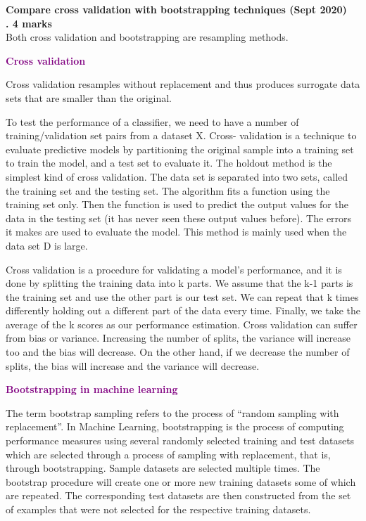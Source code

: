 
\textbf{\textcolor{LightMagenta}{Compare cross validation with bootstrapping techniques  (Sept 2020) \\ . \hfill 4 marks}}
\\[5pt]
Both cross validation and bootstrapping are resampling methods.

\textbf{\textcolor{purple}{Cross validation}}

Cross validation resamples without replacement and thus produces surrogate data sets that are smaller than the original.

To test the performance of a classifier, we need to have a number of training/validation set pairs from a dataset X. Cross- validation is a technique to evaluate predictive models by partitioning the original sample into a training set to train the model, and a test set to evaluate it. The holdout method is the simplest kind of cross validation. The data set is separated into two sets, called the training set and the testing set. The algorithm
fits a function using the training set only.
Then the function is used to predict the output values for the data in the testing set (it has never seen these output values before). The errors it makes are used to evaluate the
model. This method is mainly used when the data set D is large.

Cross validation is a procedure for validating a model's performance, and it is done by splitting the training data into k parts. We assume that the k-1 parts is the training set and use the other part is our test set. We can repeat that k times differently holding out a different part of the data every time. Finally, we take the average of the k scores as our performance estimation. Cross validation can suffer from bias or variance. Increasing the number of splits, the variance will increase too and the bias will decrease. On the other hand, if we decrease the number of splits, the bias will increase and the variance will decrease.


\textbf{\textcolor{purple}{Bootstrapping in machine learning}}

The term bootstrap sampling refers to the process of “random sampling with replacement”. 
In Machine Learning, bootstrapping is the process of computing performance measures using several randomly selected training and test datasets which are selected through a process of sampling with replacement, that is, through bootstrapping. Sample datasets are selected multiple times. The bootstrap procedure will create one or more new training datasets some of which are repeated. The corresponding test datasets are then constructed from the set of examples that were not selected for the respective training datasets.

